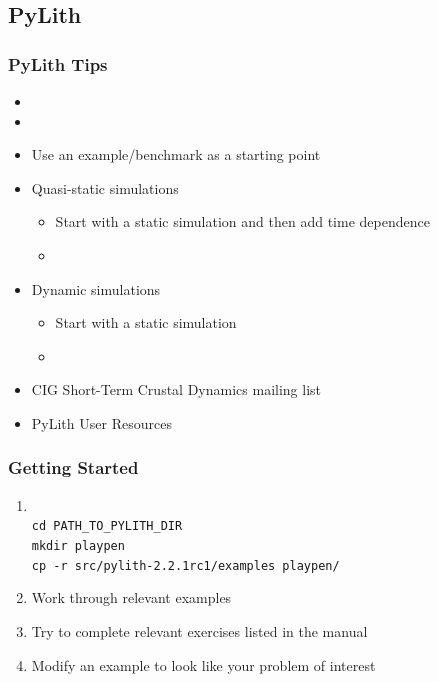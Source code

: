 \documentclass[aspectratio=169]{beamer}
\begin{document}
\subsection{PyLith}

\begin{frame}
  \frametitle{PyLith Tips}
  \summary{}
 
  \begin{itemize}
  \item {}
  \item {}
  \item Use an example/benchmark as a starting point
  \item Quasi-static simulations
    \begin{itemize}
    \item Start with a static simulation and then add time dependence
    \item {}
    \end{itemize}
  \item Dynamic simulations
    \begin{itemize}
    \item Start with a static simulation
    \item {}
    \end{itemize}
  \item CIG Short-Term Crustal Dynamics mailing list\\
    {\tt {}}
  \item PyLith User Resources\\
    {\small\tt {}}
  \end{itemize}

\end{frame}


\begin{frame}
  \frametitle{Getting Started}
  \summary{}

  \begin{enumerate}
  \item {}\\
    {\tt cd PATH\_TO\_PYLITH\_DIR} \\
    {\tt mkdir playpen} \\
    {\tt cp -r src/pylith-2.2.1rc1/examples playpen/}
  \item Work through relevant examples
  \item Try to complete relevant exercises listed in the manual
  \item Modify an example to look like your problem of interest
  \end{enumerate}

\end{frame}


\end{document}
